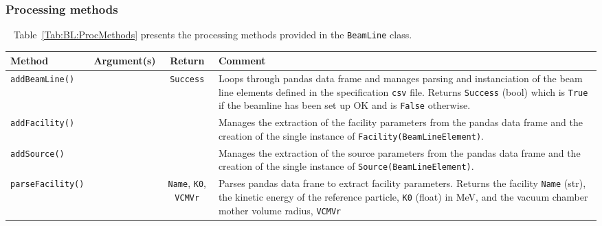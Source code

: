 \subsubsection{Processing methods} ~\newline
\noindent
Table~\ref{Tab:BL:ProcMethods} presents the processing methods provided
in the \texttt{BeamLine} class.
\begin{sidewaystable}[h]
  \caption{
    Processing methods provided by the \texttt{BeamLine}
    class. 
  }
  \label{Tab:BL:ProcMethods}
  \begin{center}
    \begin{tabular}{|l|c|c|p{10cm}|}
      \hline
      \textbf{Method} & \textbf{Argument(s)} & \textbf{Return} & \textbf{Comment}                                            \\
      \hline
      \texttt{addBeamLine()}   &  & \texttt{Success} & Loops through pandas data frame and manages parsing and instanciation
                                                       of the beam line elements defined in the specification \texttt{csv} file.
                                                       Returns \texttt{Success} (bool) which is \texttt{True} if the beamline
                                                       has been set up OK and is \texttt{False} otherwise.                     \\
      \texttt{addFacility()}   &  &  & Manages the extraction of the facility parameters from the pandas data frame and the
                                       creation of the single instance of \texttt{Facility(BeamLineElement)}.                  \\
      \texttt{addSource()}     &  &  & Manages the extraction of the source parameters from the pandas data frame and the
                                       creation of the single instance of \texttt{Source(BeamLineElement)}.                  \\
      \texttt{parseFacility()} &  & \texttt{Name}, \texttt{K0}, \texttt{VCMVr} & Parses pandas data frane to extract
                                                                                 facility parameters.
                                                                                 Returns the facility \texttt{Name} (str), the
                                                                                 kinetic energy of the reference particle,
                                                                                 \texttt{K0} (float) in MeV, and the vacuum
                                                                                 chamber mother volume radius, \texttt{VCMVr}

\end{tabular}
\end{center}
\end{sidewaystable}
